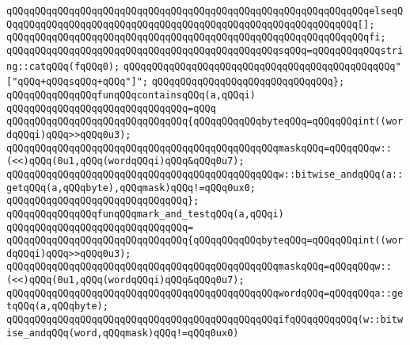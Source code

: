 \verb|qQQqqQQqqQQqqQQqqQQqqQQqqQQqqQQqqQQqqQQqqQQqqQQqqQQqqQQqqQQqqQQqelseqQQqqQQqqQQqqQQqqQQqqQQqqQQqqQQqqQQqqQQqqQQqqQQqqQQqqQQqqQQqqQQq[];|\newline
\verb|qQQqqQQqqQQqqQQqqQQqqQQqqQQqqQQqqQQqqQQqqQQqqQQqqQQqqQQqqQQqqQQqfi;|\newline
\newline
\verb|qQQqqQQqqQQqqQQqqQQqqQQqqQQqqQQqqQQqqQQqqQQqqQQqsqQQq=qQQqqQQqqQQqstring::catqQQq(fqQQq0);|\newline
\newline
\verb|qQQqqQQqqQQqqQQqqQQqqQQqqQQqqQQqqQQqqQQqqQQqqQQq"["qQQq+qQQqsqQQq+qQQq"]";|\newline
\verb|qQQqqQQqqQQqqQQqqQQqqQQqqQQqqQQq};|\newline
\newline
\newline
\verb|qQQqqQQqqQQqqQQqfunqQQqcontainsqQQq(a,qQQqi)|\newline
\verb|qQQqqQQqqQQqqQQqqQQqqQQqqQQqqQQq=qQQq|\newline
\verb|qQQqqQQqqQQqqQQqqQQqqQQqqQQqqQQq{qQQqqQQqqQQqbyteqQQq=qQQqqQQqint((wordqQQqi)qQQq>>qQQq0u3);|\newline
\verb|qQQqqQQqqQQqqQQqqQQqqQQqqQQqqQQqqQQqqQQqqQQqqQQqmaskqQQq=qQQqqQQqw::(<<)qQQq(0u1,qQQq(wordqQQqi)qQQq&qQQq0u7);|\newline
\newline
\verb|qQQqqQQqqQQqqQQqqQQqqQQqqQQqqQQqqQQqqQQqqQQqqQQqw::bitwise_andqQQq(a::getqQQq(a,qQQqbyte),qQQqmask)qQQq!=qQQq0ux0;|\newline
\verb|qQQqqQQqqQQqqQQqqQQqqQQqqQQqqQQq};|\newline
\newline
\newline
\verb|qQQqqQQqqQQqqQQqfunqQQqmark_and_testqQQq(a,qQQqi)|\newline
\verb|qQQqqQQqqQQqqQQqqQQqqQQqqQQqqQQq=|\newline
\verb|qQQqqQQqqQQqqQQqqQQqqQQqqQQqqQQq{qQQqqQQqqQQqbyteqQQq=qQQqqQQqint((wordqQQqi)qQQq>>qQQq0u3);|\newline
\verb|qQQqqQQqqQQqqQQqqQQqqQQqqQQqqQQqqQQqqQQqqQQqqQQqmaskqQQq=qQQqqQQqw::(<<)qQQq(0u1,qQQq(wordqQQqi)qQQq&qQQq0u7);|\newline
\verb|qQQqqQQqqQQqqQQqqQQqqQQqqQQqqQQqqQQqqQQqqQQqqQQqwordqQQq=qQQqqQQqa::getqQQq(a,qQQqbyte);|\newline
\newline
\verb|qQQqqQQqqQQqqQQqqQQqqQQqqQQqqQQqqQQqqQQqqQQqqQQqifqQQqqQQqqQQq(w::bitwise_andqQQq(word,qQQqmask)qQQq!=qQQq0ux0)|\newline
